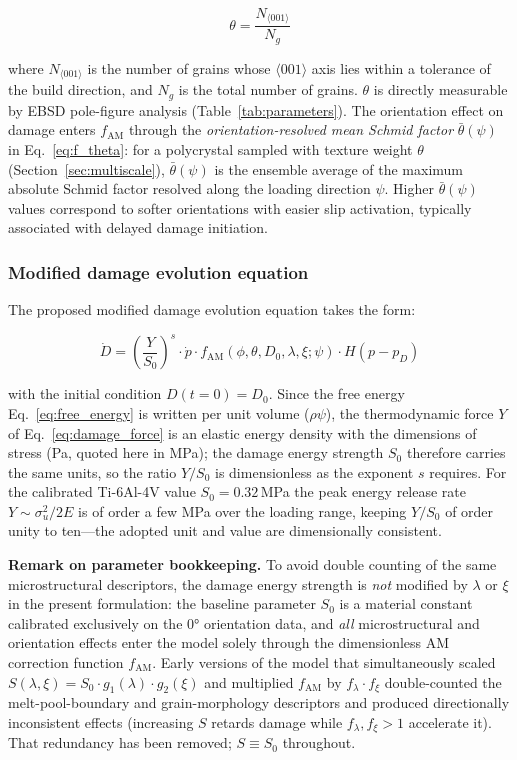 \begin{equation}
\theta = \frac{N_{\langle001\rangle}}{N_g}
\label{eq:theta}
\end{equation}

where $N_{\langle001\rangle}$ is the number of grains whose $\langle001\rangle$ axis lies within a tolerance of the build direction, and $N_g$ is the total number of grains. $\theta$ is directly measurable by EBSD pole-figure analysis (Table~\ref{tab:parameters}). The orientation effect on damage enters $f_{\text{AM}}$ through the \emph{orientation-resolved mean Schmid factor} $\bar{\theta}(\psi)$ in Eq.~\eqref{eq:f_theta}: for a polycrystal sampled with texture weight $\theta$ (Section~\ref{sec:multiscale}), $\bar{\theta}(\psi)$ is the ensemble average of the maximum absolute Schmid factor resolved along the loading direction $\psi$. Higher $\bar{\theta}(\psi)$ values correspond to softer orientations with easier slip activation, typically associated with delayed damage initiation.

\subsubsection{Modified damage evolution equation}

The proposed modified damage evolution equation takes the form:

\begin{equation}
\dot{D} = \left(\frac{Y}{S_0}\right)^{s} \cdot \dot{p} \cdot f_{\text{AM}}(\phi, \theta, D_0, \lambda, \xi; \psi) \cdot H(p - p_D)
\label{eq:modified_evolution}
\end{equation}

with the initial condition $D(t=0) = D_0$. Since the free energy Eq.~\eqref{eq:free_energy} is written per unit volume ($\rho\psi$), the thermodynamic force $Y$ of Eq.~\eqref{eq:damage_force} is an elastic energy density with the dimensions of stress (Pa, quoted here in MPa); the damage energy strength $S_0$ therefore carries the same units, so the ratio $Y/S_0$ is dimensionless as the exponent $s$ requires. For the calibrated Ti-6Al-4V value $S_0 = 0.32$\,MPa the peak energy release rate $Y \sim \sigma_u^2/2E$ is of order a few MPa over the loading range, keeping $Y/S_0$ of order unity to ten---the adopted unit and value are dimensionally consistent.

\textbf{Remark on parameter bookkeeping.} To avoid double counting of the same microstructural descriptors, the damage energy strength is \emph{not} modified by $\lambda$ or $\xi$ in the present formulation: the baseline parameter $S_0$ is a material constant calibrated exclusively on the $\ang{0}$ orientation data, and \emph{all} microstructural and orientation effects enter the model solely through the dimensionless AM correction function $f_{\text{AM}}$. Early versions of the model that simultaneously scaled $S(\lambda,\xi) = S_0 \cdot g_1(\lambda) \cdot g_2(\xi)$ and multiplied $f_{\text{AM}}$ by $f_\lambda \cdot f_\xi$ double-counted the melt-pool-boundary and grain-morphology descriptors and produced directionally inconsistent effects (increasing $S$ retards damage while $f_\lambda, f_\xi > 1$ accelerate it). That redundancy has been removed; $S \equiv S_0$ throughout.

